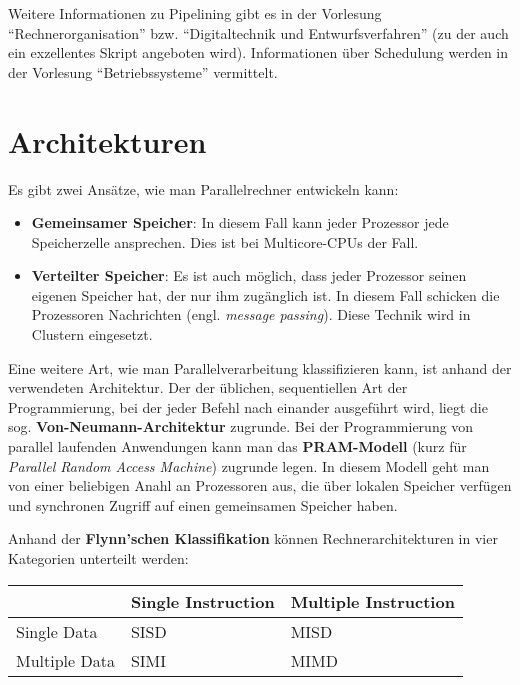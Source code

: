 Weitere Informationen zu Pipelining gibt es in der Vorlesung \enquote{Rechnerorganisation}
bzw. \enquote{Digitaltechnik und Entwurfsverfahren} (zu der auch ein exzellentes Skript angeboten wird). Informationen über Schedulung werden in der Vorlesung \enquote{Betriebssysteme}
vermittelt.

\section{Architekturen}
Es gibt zwei Ansätze, wie man Parallelrechner entwickeln kann:
\begin{itemize}
    \item \textbf{Gemeinsamer Speicher}: In diesem Fall kann jeder Prozessor 
          jede Speicherzelle ansprechen. Dies ist bei Multicore-CPUs der Fall.
    \item \textbf{Verteilter Speicher}: Es ist auch möglich, dass jeder Prozessor
          seinen eigenen Speicher hat, der nur ihm zugänglich ist. In diesem Fall
          schicken die Prozessoren Nachrichten (engl. \textit{message passing}). Diese Technik wird in Clustern eingesetzt.
\end{itemize}

Eine weitere Art, wie man Parallelverarbeitung klassifizieren kann, ist anhand 
der verwendeten Architektur. Der der üblichen, sequentiellen Art der Programmierung,
bei der jeder Befehl nach einander ausgeführt wird, liegt die sog.
\textbf{Von-Neumann-Architektur} zugrunde.
Bei der Programmierung von parallel laufenden Anwendungen kann man das \textbf{PRAM-Modell} (kurz für \textit{Parallel Random Access Machine}) zugrunde legen.
In diesem Modell geht man von einer beliebigen Anahl an Prozessoren aus, die
über lokalen Speicher verfügen und synchronen Zugriff auf einen gemeinsamen
Speicher haben.

Anhand der \textbf{Flynn'schen Klassifikation}
können Rechnerarchitekturen in vier Kategorien unterteilt werden:

\begin{table}[h]
    \centering
    \begin{tabular}{l|ll}
    ~              & Single Instruction  & Multiple Instruction \\ \hline
    Single Data    & SISD                & MISD                  \\
    Multiple Data  & SIMI                & MIMD                  \\
    \end{tabular}
\end{table}

